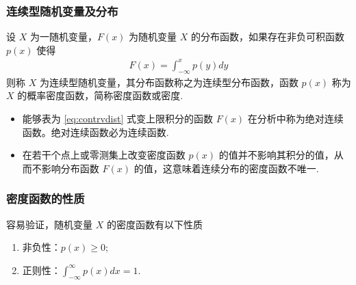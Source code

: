


\begin{frame}
	\frametitle{连续型随机变量及分布}
	\begin{defi}[连续型随机变量] 设 $X$ 为一随机变量，$F (x)$ 为随机变量 $X$ 的分布函数，如果存在非负可积函数 $p (x)$ 使得
		\begin{eqnarray}\label{eq:contrvdist}
			F(x)=\int_{-\infty}^xp(y)dy
		\end{eqnarray}
		则称 $X$ 为连续型随机变量，其分布函数称之为连续型分布函数，函数 $p (x)$ 称为 $X$ 的概率密度函数，简称密度函数或密度.
	\end{defi}
	\pause
	\begin{rmk}
		\begin{itemize}[<+-|alert@+>]
			\item 能够表为 \eqref{eq:contrvdist} 式变上限积分的函数 $F (x)$ 在分析中称为绝对连续函数。绝对连续函数必为连续函数.
			\item 在若干个点上或零测集上改变密度函数 $p (x)$ 的值并不影响其积分的值，从而不影响分布函数 $F (x)$ 的值，这意味着连续分布的密度函数不唯一.
		\end{itemize}
	\end{rmk}

\end{frame}

\begin{frame}
	\frametitle{密度函数的性质}
	容易验证，随机变量 $X$ 的密度函数有以下性质
	\begin{enumerate}[<+-|alert@+>]
		\item 非负性：$p (x)\ge 0$;
		\item 正则性：$\int_{-\infty}^\infty p (x) dx=1$.
	\end{enumerate}

\end{frame}


